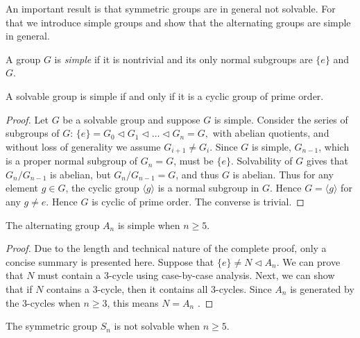 An important result is that symmetric groups are in general not solvable.
For that we introduce simple groups and show that the alternating groups are simple in general. 

\begin{definition}
	A group $G$ is \textit{simple} if it is nontrivial and its only normal subgroups are $\{ e \}$ and $G$. 
\end{definition}

\begin{theorem} \label{thm:soluble-and-simple}
	A solvable group is simple if and only if it is a cyclic group of prime order.
\end{theorem}

\begin{proof}
	Let $G$ be a solvable group and suppose $G$ is simple. Consider the series of subgroups of $G$: 
	$
	\{ e \}=G_0 \triangleleft G_1 \triangleleft \ldots \triangleleft G_n=G,
	$
	with abelian quotients, and without loss of generality we assume $G_{i+1} \neq G_i$. Since $G$ is simple, $G_{n-1}$, which is a proper normal subgroup of $G_n = G$, must be $\{ e \}$. Solvability of $G$ gives that $G_n / G_{n -1 }$ is abelian, but $G_n / G_{n - 1} = G$, and thus $G$ is abelian. Thus for any element $g \in G$, the cyclic group $\langle g\rangle$ is a normal subgroup in $G$. Hence  $G = \langle g\rangle$ for any $g \neq e$. Hence $G$ is cyclic of prime order.
	The converse is trivial.
\end{proof}


\begin{theorem} \label{thm:simple-alternating}
	The alternating group $A_n$ is simple when $n \ge 5$. 
\end{theorem}

\begin{proof}
	Due to the length and technical nature of the complete proof, only a concise summary is presented here. 
	Suppose that $\{ e \} \neq N \triangleleft A_n$. We can prove that $N$ must contain a $3$-cycle using case-by-case analysis. Next, we can show that if $N$ contains a $3$-cycle, then it contains all $3$-cycles. Since $A_n$ is generated by the $3$-cycles when $n \ge 3$, this means $N = A_n$ \cite[p.~164]{Stewart}.
\end{proof}

\begin{theorem} \label{thm:symmetric-not-soluble-appendix}
	The symmetric group $S_n$ is not solvable when $n \ge 5$. 
\end{theorem}

